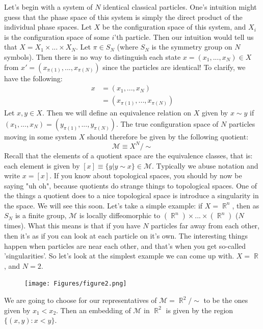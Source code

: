 \documentclass{article}
\DeclareMathOperator{\RR}{\mathbb{R}}
\begin{document}
Let's begin with a system of $N$ identical classical particles. One's intuition might guess that the phase space of this system is simply the direct product of the individual phase spaces. Let $X$ be the configuration space of this system, and $X_i$ is the configuration space of some $i$'th particle. Then our intuition would tell us that $X = X_1 \times ... \times X_N$. Let $\pi \in S_N$ (where $S_N$ is the symmetry group on $N$ symbols). Then there is no way to distinguish each state $x = (x_1,...,x_N) \in X$ from $x' = (x_{\pi(1)},...,x_{\pi(N)})$ since the particles are identical!  To clarify, we have the following:
\begin{align*}
    x &= (x_1,...,x_N) \\
      &= (x_{\pi(1)}, ... , x_{\pi(N)})
\end{align*}
Let $x, y \in X$. Then we will define an equivalence relation on $X$ given by $x \sim y$ if $(x_1,...,x_N) = (y_{\pi(1)},...,y_{\pi(N)})$. The true configuration space of $N$ particles moving in some system $X$ should therefore be given by the following quotient:
\[\mathcal{M} \equiv X^N / \sim\]
Recall that the elements of a quotient space are the equivalence classes, that is: each element is given by $[x] \equiv \{y | y \sim x\} \in \mathcal{M}$. Typically we abuse notation and write $x = [x]$. If you know about topological spaces, you should by now be saying "uh oh", because quotients do strange things to topological spaces. One of the things a quotient does to a nice topological space is introduce a singularity in the space. We will see this soon. Let's take a simple example: if $X = \RR^n$, then as $S_N$ is a finite group, $\mathcal{M}$ is locally diffeomorphic to $(\RR^n) \times ... \times (\RR^n)$ ($N$ times). What this means is that if you have $N$ particles far away from each other, then it's as if you can look at each particle on it's own. The interesting things happen when particles are near each other, and that's when you get so-called 'singularities'. So let's look at the simplest example we can come up with. $X = \RR$, and $N = 2$.
\pagebreak
\begin{figure}[ht]
    \centering
    \texttt{[image: Figures/figure2.png]}
    \caption*{}
    \label{fig:fig12}
\end{figure}

We are going to choose for our representatives of $\mathcal{M} = \RR^2/\sim$ to be the ones given by $x_1 < x_2$. Then an embedding of $\mathcal{M}$ in $\RR^2$ is given by the region $\{(x,y):x<y\}$.
\end{document}
